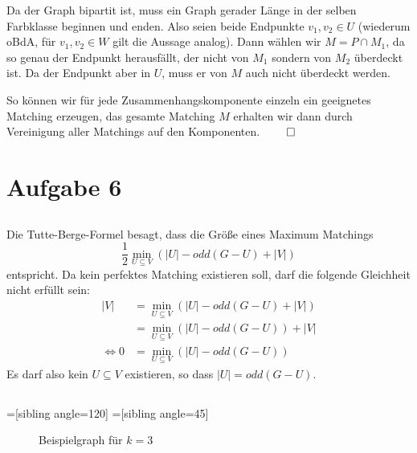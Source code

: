 \documentclass[a4paper]{article}
\begin{document}
Da der Graph bipartit ist, muss ein Graph gerader Länge in der selben
Farbklasse beginnen und enden. Also seien beide Endpunkte $v_1, v_2 \in U$
(wiederum oBdA, für $v_1, v_2 \in W$ gilt die Aussage analog).
Dann wählen wir $M = P \cap M_1$, da so genau der Endpunkt herausfällt, der
nicht von $M_1$ sondern von $M_2$ überdeckt ist. Da der Endpunkt aber in
$U$, muss er von $M$ auch nicht überdeckt werden.

So können wir für jede Zusammenhangskomponente einzeln ein geeignetes
Matching erzeugen, das gesamte Matching $M$ erhalten wir dann durch
Vereinigung aller Matchings auf den Komponenten. $\qed$

\section{Aufgabe 6}
\subsection{}
Die Tutte-Berge-Formel besagt, dass die Größe eines Maximum Matchings
\[
	\frac{1}{2} \min_{U \subseteq V} ( |U| - odd(G - U) + |V|)
\]
entspricht. Da kein perfektes Matching existieren soll, darf die folgende
Gleichheit nicht erfüllt sein:
\begin{align*}
|V| &= \min_{U \subseteq V} ( |U| - odd(G - U) + |V|) \\
	&= \min_{U \subseteq V} ( |U| - odd(G - U) ) + |V| \\
\Leftrightarrow 0 &= \min_{U \subseteq V} ( |U| - odd(G - U) )
\end{align*}
Es darf also kein $U \subseteq V$ existieren, so dass $|U| = odd(G - U)$.

\subsection{}

=[sibling angle=120]
=[sibling angle=45]
\begin{figure}[h]\caption{Beispielgraph für $k=3$}
\begin{center}
\end{center}
\end{figure}
\end{document}
